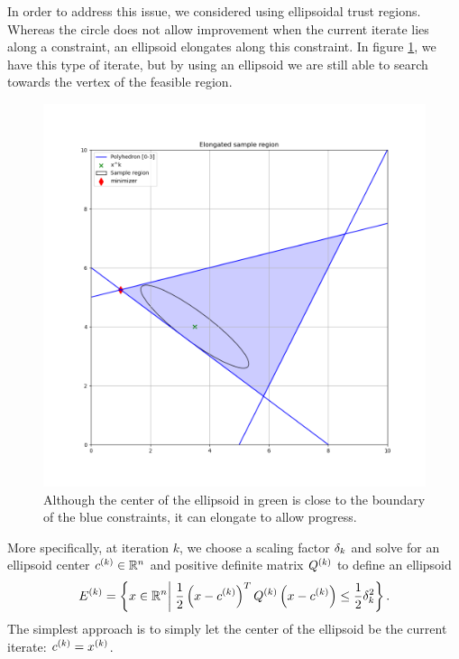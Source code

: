 In order to address this issue, we considered using ellipsoidal trust regions.
Whereas the circle does not allow improvement when the current iterate lies along a constraint, an ellipsoid elongates along this constraint.
In figure \cref{ellipse_adv}, we have this type of iterate, but by using an ellipsoid we are still able to search towards the vertex of the feasible region.
\begin{figure}[ht]
    \centering
    \includegraphics[scale=0.4]{images/long_ellipsoid.png}
    \caption[An ellipsoidal trust region allows for more progress than a circular trust region.] {
    	Although the center of the ellipsoid in green is close to the boundary of the blue constraints, it can elongate to allow progress.
    }
    \label{ellipse_adv}
\end{figure}



More specifically, at iteration $k$, we choose a scaling factor $\delta_k$ and solve for an ellipsoid center $c^{(k)} \in \mathbb R^n$ and positive definite matrix ${Q^{(k)}}$ to define an ellipsoid
\begin{align*}
{E^{(k)}} = \left\{x \in \mathbb R^n \bigg| \; \frac 1 2 \left(x - c^{(k)}\right)^T{Q^{(k)}}\left(x - c^{(k)}\right) \le \frac 1 2 \delta_k^2 \right\}.
\end{align*}
The simplest approach is to simply let the center of the ellipsoid be the current iterate: $c^{(k)} = x^{(k)}$.





